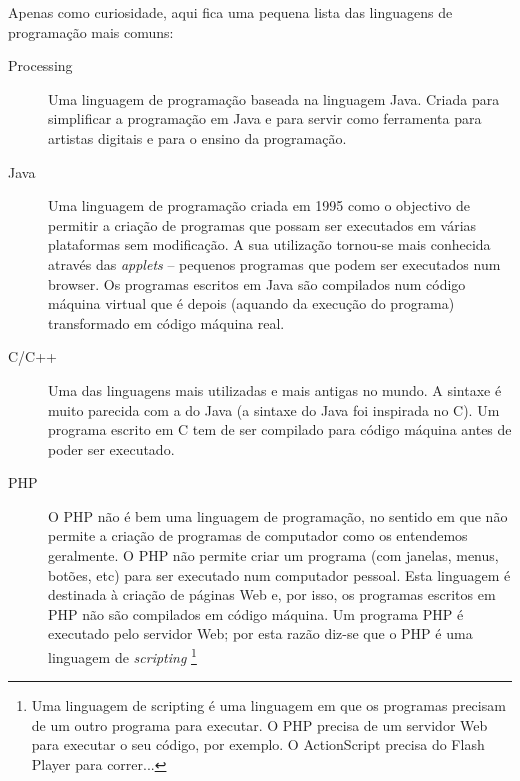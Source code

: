 Apenas como curiosidade, aqui fica uma pequena lista das linguagens de programação mais comuns:
\begin{description}
\item[Processing]
Uma linguagem de programação baseada na linguagem Java. Criada para simplificar a programação em Java e para servir como ferramenta para artistas digitais e para o ensino da programação.

\item[Java] 
Uma linguagem de programação criada em 1995 como o objectivo de permitir a criação de programas que possam ser executados em várias plataformas sem modificação. A sua utilização tornou-se mais conhecida através das \emph{applets} -- pequenos programas que podem ser executados num browser. Os programas escritos em Java são compilados num código máquina virtual que é depois (aquando da execução do programa) transformado em código máquina real.

\item[C/C++] 
Uma das linguagens mais utilizadas e mais antigas no mundo. A sintaxe é muito parecida com a do Java (a sintaxe do Java foi inspirada no C). Um programa escrito em C tem de ser compilado para código máquina antes de poder ser executado.

\item[PHP] 
O PHP não é bem uma linguagem de programação, no sentido em que não permite a criação de programas de computador como os entendemos geralmente. O PHP não permite criar um programa (com janelas, menus, botões, etc) para ser executado num computador pessoal. Esta linguagem é destinada à criação de páginas Web e, por isso, os programas escritos em PHP não são compilados em código máquina. Um programa PHP é executado pelo servidor Web; por esta razão diz-se que o PHP é uma linguagem de \emph{scripting}%
\footnote{Uma linguagem de scripting é uma linguagem em que os programas precisam de um outro programa para executar. O PHP precisa de um servidor Web para executar o seu código, por exemplo. O ActionScript precisa do Flash Player para correr...}



\end{description}

